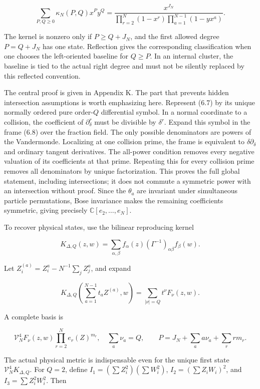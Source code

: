 \documentclass[a4paper,11pt]{article}
\numberwithin{equation}{section}
\begin{document}
\[
\boxed{\displaystyle
\sum_{P,Q\ge0}\kappa_N(P,Q)x^Py^Q
=\frac{x^{J_N}}
{\prod_{r=2}^N(1-x^r)\prod_{a=1}^{N-1}(1-yx^a)}.}
\tag{6.10}
\]

The kernel is nonzero only if \(P\ge Q+J_N\), and the first allowed degree \(P=Q+J_N\) has one state. Reflection gives the corresponding classification when one chooses the left-oriented baseline for \(Q\ge P\). In an internal cluster, the baseline is tied to the actual right degree and must not be silently replaced by this reflected convention.

The central proof is given in Appendix K. The part that prevents hidden intersection assumptions is worth emphasizing here. Represent (6.7) by its unique normally ordered pure order-\(Q\) differential symbol. In a normal coordinate to a collision, the coefficient of \(\partial_\delta^r\) must be divisible by \(\delta^r\). Expand this symbol in the frame (6.8) over the fraction field. The only possible denominators are powers of the Vandermonde. Localizing at one collision prime, the frame is equivalent to \(\delta\partial_\delta\) and ordinary tangent derivatives. The all-power condition removes every negative valuation of its coefficients at that prime. Repeating this for every collision prime removes all denominators by unique factorization. This proves the full global statement, including intersections; it does not commute a symmetric power with an intersection without proof. Since the \(\theta_a\) are invariant under simultaneous particle permutations, Bose invariance makes the remaining coefficients symmetric, giving precisely \(\mathbb C[e_2,\ldots,e_N]\).

To recover physical states, use the bilinear reproducing kernel

\[
K_{\Delta,Q}(z,w)=\sum_{\alpha,\beta}
f_\alpha(z)(\Gamma^{-1})_{\alpha\beta}f_\beta(w).
\tag{6.11}
\]

Let \(Z_i^{(a)}=Z_i^a-N^{-1}\sum_jZ_j^a\), and expand

\[
K_{\Delta,Q}\!\left(\sum_{a=1}^{N-1}t_aZ^{(a)},w\right)
=\sum_{|\nu|=Q}t^\nu F_\nu(z,w).
\tag{6.12}
\]

A complete basis is

\[
\mathcal V_N^4F_\nu(z,w)\prod_{r=2}^N e_r(Z)^{m_r},
\quad
\sum_a\nu_a=Q,\qquad
P=J_N+\sum_a a\nu_a+\sum_r rm_r.
\tag{6.13}
\]

The actual physical metric is indispensable even for the unique first state \(\mathcal V_N^4K_{\Delta,Q}\). For \(Q=2\), define \(I_1=(\sum Z_i^2)(\sum W_i^2)\), \(I_2=(\sum Z_iW_i)^2\), and \(I_3=\sum Z_i^2W_i^2\). Then
\end{document}
